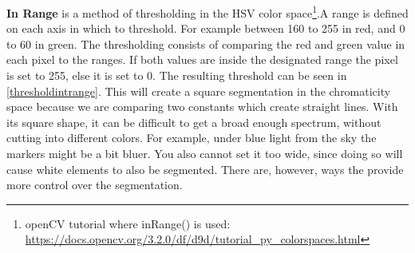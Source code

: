 \textbf{In Range} is a method of thresholding in the HSV color space\footnote{openCV tutorial where inRange() is used: \url{https://docs.opencv.org/3.2.0/df/d9d/tutorial\_py\_colorspaces.html}}.A range is defined on each axis in which to threshold. For example between 160 to 255 in red, and 0 to 60 in green. The thresholding consists of comparing the red and green value in each pixel to the ranges. If both values are inside the designated range the pixel is set to 255, else it is set to 0. The resulting threshold can be seen in \autoref{thresholdintrange}. This will create a square segmentation in the chromaticity space because we are comparing two constants which create straight lines. With its square shape, it can be difficult to get a broad enough spectrum, without cutting into different colors. For example, under blue light from the sky the markers might be a bit bluer. You also cannot set it too wide, since doing so will cause white elements to also be segmented. There are, however, ways the provide more control over the segmentation.\\
